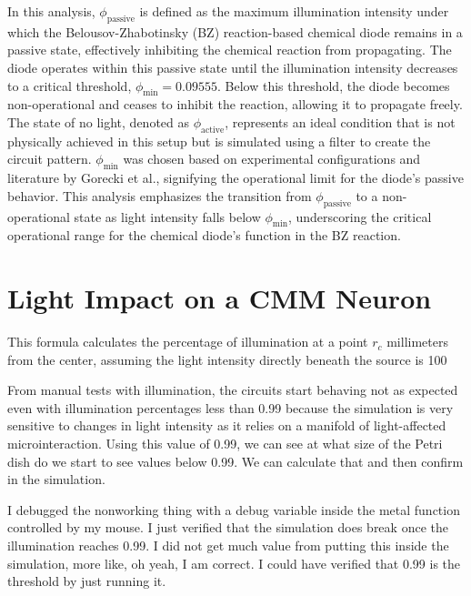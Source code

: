 In this analysis, \( \phi_{\text{passive}} \) is defined as the maximum illumination intensity under which the Belousov-Zhabotinsky (BZ) reaction-based chemical diode remains in a passive state, effectively inhibiting the chemical reaction from propagating. The diode operates within this passive state until the illumination intensity decreases to a critical threshold, \( \phi_{\min} = 0.09555 \). Below this threshold, the diode becomes non-operational and ceases to inhibit the reaction, allowing it to propagate freely. The state of no light, denoted as \( \phi_{\text{active}} \), represents an ideal condition that is not physically achieved in this setup but is simulated using a filter to create the circuit pattern. \( \phi_{\min} \) was chosen based on experimental configurations and literature by Gorecki et al., signifying the operational limit for the diode's passive behavior. This analysis emphasizes the transition from \( \phi_{\text{passive}} \) to a non-operational state as light intensity falls below \( \phi_{\min} \), underscoring the critical operational range for the chemical diode's function in the BZ reaction.



\section{Light Impact on a CMM Neuron \citep{stovold2017reaction}}
This formula calculates the percentage of illumination at a point \( r_c \) millimeters from the center, assuming the light intensity directly beneath the source is 100%


From manual tests with illumination, the circuits start behaving not as expected even with illumination percentages less than 0.99 because the simulation is very sensitive to changes in light intensity as it relies on a manifold of light-affected microinteraction. Using this value of 0.99, we can see at what size of the Petri dish do we start to see values below 0.99. We can calculate that and then confirm in the simulation. 


I debugged the nonworking thing with a debug variable inside the metal function controlled by my mouse. 
I just verified that the simulation does break once the illumination reaches 0.99. I did not get much value from putting this inside the simulation, more like, oh yeah, I am correct.
I could have verified that 0.99 is the threshold by just running 
it.


